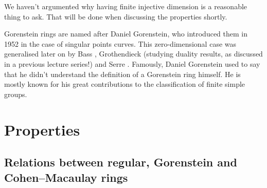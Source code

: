 \documentclass[10pt,a4paper]{article}
\begin{document}
We haven't argumented why having finite injective dimension is a reasonable thing to ask. That will be done when discussing the properties shortly.

\begin{remark}
  Gorenstein rings are named after Daniel Gorenstein, who introduced them in 1952 \cite{gorenstein-arithmetic-theory-adjoint-plane-curves} in the case of singular points curves. This zero-dimensional case was generalised later on by Bass \cite{bass-ubiquity-gorenstein-rings}, Grothendieck \cite{grothendieck-theoremes-de-dualite} (studying duality results, as discussed in a previous lecture series!) and Serre \cite{serre-sur-les-modules-projectifs}. Famously, Daniel Gorenstein used to say that he didn't understand the definition of a Gorenstein ring himself. He is mostly known for his great contributions to the classification of finite simple groups.
\end{remark}


\section{Properties}
\subsection{Relations between regular, Gorenstein and Cohen--Macaulay rings}
\end{document}

